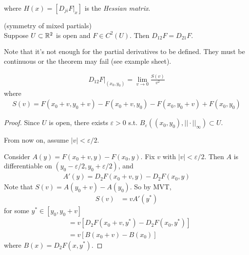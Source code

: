 \documentclass[a4paper]{article}
\begin{document}
where $H(x)=[D_{ji}F|_x]$ is the \emph{Hessian matrix}.

\begin{thm} (symmetry of mixed partials)\\
Suppose $U \subset \mathbb{R}^2$ is open and $F \in C^2(U)$. Then $D_{12}F = D_{21}F$.

Note that it's not enough for the partial derivatives to be defined. They must be continuous or the theorem may fail (see example sheet).
\end{thm}

\begin{lemma}
\begin{equation*}
\begin{aligned}
D_{12}F|_{(x_0,y_0)} = \lim_{v \to 0} \frac{S(v)}{v^2}
\end{aligned}
\end{equation*}
where
\begin{equation*}
\begin{aligned}
S(v) = F(x_0+v,y_0+v)-F(x_0+v,y_0)-F(x_0,y_0+v)+F(x_0,y_0)
\end{aligned}
\end{equation*}
\begin{proof}
Since $U$ is open, there exists $\varepsilon>0$ s.t. $B_\varepsilon((x_0,y_0),||\cdot||_\infty) \subset U$.

From now on, assume $|v|<\varepsilon/2$.

Consider $A(y)=F(x_0+v,y)-F(x_0,y)$. Fix $v$ with $|v|<\varepsilon/2$. Then $A$ is differentiable on $(y_0-\varepsilon/2,y_0+\varepsilon/2)$, and
\begin{equation*}
\begin{aligned}
A'(y)=D_2 F(x_0+v,y)-D_2F(x_0,y)
\end{aligned}
\end{equation*}
Note that $S(v) = A(y_0+v)-A(y_0)$. So by MVT,
\begin{equation*}
\begin{aligned}
S(v)&=vA'(y^*)
\end{aligned}
\end{equation*}
for some $y^* \in [y_0,y_0+v]$
\begin{equation*}
\begin{aligned}
&=v[D_2 F(x_0+v,y^*)-D_2F(x_0,y^*)]\\
&=v[B(x_0+v)-B(x_0)]
\end{aligned}
\end{equation*}
where $B(x)=D_2F(x,y^*)$.


\end{proof}
\end{lemma}
\end{document}
